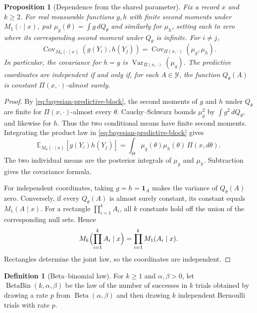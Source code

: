 \documentclass[11pt,oneside]{book}
\newtheorem{proposition}[theorem]{Proposition}
\theoremstyle{definition}
\newtheorem{definition}[theorem]{Definition}
\theoremstyle{remark}
\begin{document}
\begin{proposition}[Dependence from the shared parameter]
\label{prop:bayesian-predictive-dependence}
Fix a record $x$ and $k\geq2$. For real measurable functions $g,h$
with finite second moments under $M_1(\cdot\mid x)$, put
$\mu_g(\theta)=\int g\,dQ_\theta$ and similarly for $\mu_h$,
setting each to zero where its corresponding second moment
under $Q_\theta$ is infinite. For $i\ne j$,
\begin{equation}
\operatorname{Cov}_{M_k(\cdot\mid x)}(g(Y_i),h(Y_j))
=\operatorname{Cov}_{\Pi(x,\cdot)}(\mu_g,\mu_h).
\label{eq:bayesian-predictive-covariance}
\end{equation}
In particular, the covariance for $h=g$ is
$\operatorname{Var}_{\Pi(x,\cdot)}(\mu_g)$. The predictive
coordinates are independent if and only if, for each
$A\in\mathcal Y$, the function $Q_\theta(A)$ is constant
$\Pi(x,\cdot)$-almost surely.
\end{proposition}
\begin{proof}
By \eqref{eq:bayesian-predictive-block}, the second moments of $g$
and $h$ under $Q_\theta$ are finite for $\Pi(x,\cdot)$-almost every
$\theta$. Cauchy--Schwarz bounds $\mu_g^2$ by $\int g^2\,dQ_\theta$,
and likewise for $h$. Thus the two conditional means have
finite second moments. Integrating the product law in
\eqref{eq:bayesian-predictive-block} gives
\[
\mathbb E_{M_k(\cdot\mid x)}[g(Y_i)h(Y_j)]
=\int_\Theta\mu_g(\theta)\mu_h(\theta)\,\Pi(x,d\theta).
\]
The two individual means are the posterior integrals of
$\mu_g$ and $\mu_h$. Subtraction gives the covariance formula.

For independent coordinates, taking $g=h=\mathbf 1_A$ makes the
variance of $Q_\theta(A)$ zero. Conversely, if every $Q_\theta(A)$
is almost surely constant, its constant equals $M_1(A\mid x)$.
For a rectangle $\prod_{i=1}^k A_i$, all $k$ constants hold off
the union of the corresponding null sets. Hence
\[
M_k\Bigl(\prod_{i=1}^k A_i\mid x\Bigr)=\prod_{i=1}^k M_1(A_i\mid x).
\]
Rectangles determine the joint law, so the coordinates are independent.
\end{proof}

\begin{definition}[Beta--binomial law]
\label{def:bayesian-beta-binomial}
For $k\geq1$ and $\alpha,\beta>0$, let $\operatorname{BetaBin}(k,\alpha,\beta)$
be the law of the number of successes in $k$ trials obtained by drawing
a rate $p$ from $\operatorname{Beta}(\alpha,\beta)$ and then drawing
$k$ independent Bernoulli trials with rate $p$.
\end{definition}
\end{document}
